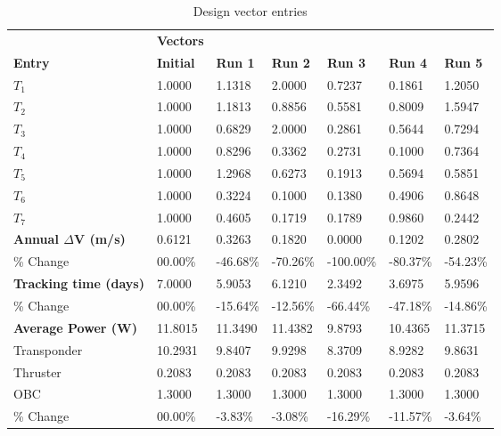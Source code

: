 \begin{table}[H]
\centering
\begin{tabular}{lllllll}
\textbf{} & \cellcolor[HTML]{EFEFEF}\textbf{Vectors} & \textbf{} & \textbf{} & \textbf{} & \textbf{} & \textbf{} \\
\rowcolor[HTML]{EFEFEF} \cellcolor[HTML]{EFEFEF}\textbf{Entry} & \cellcolor[HTML]{EFEFEF}\textbf{Initial} & \cellcolor[HTML]{EFEFEF}\textbf{Run 1} & \cellcolor[HTML]{EFEFEF}\textbf{Run 2} & \cellcolor[HTML]{EFEFEF}\textbf{Run 3} & \cellcolor[HTML]{EFEFEF}\textbf{Run 4} & \cellcolor[HTML]{EFEFEF}\textbf{Run 5} \\
$T_{1}$ & 1.0000 & 1.1318 & 2.0000 & 0.7237 & 0.1861 & 1.2050 \\
$T_{2}$ & 1.0000 & 1.1813 & 0.8856 & 0.5581 & 0.8009 & 1.5947 \\
$T_{3}$ & 1.0000 & 0.6829 & 2.0000 & 0.2861 & 0.5644 & 0.7294 \\
$T_{4}$ & 1.0000 & 0.8296 & 0.3362 & 0.2731 & 0.1000 & 0.7364 \\
$T_{5}$ & 1.0000 & 1.2968 & 0.6273 & 0.1913 & 0.5694 & 0.5851 \\
$T_{6}$ & 1.0000 & 0.3224 & 0.1000 & 0.1380 & 0.4906 & 0.8648 \\
$T_{7}$ & 1.0000 & 0.4605 & 0.1719 & 0.1789 & 0.9860 & 0.2442 \\
\rowcolor[HTML]{EFEFEF} 
\cellcolor[HTML]{EFEFEF}\textbf{Annual $\Delta \boldsymbol{V}$ (m/s)} & \cellcolor[HTML]{EFEFEF}0.6121 & 0.3263 & 0.1820 & 0.0000 & 0.1202 & 0.2802 \\
\% Change & 00.00\% &-46.68\% & -70.26\% & -100.00\% & -80.37\% & -54.23\% \\
\rowcolor[HTML]{EFEFEF} 
\cellcolor[HTML]{EFEFEF}\textbf{Tracking time (days)} & \cellcolor[HTML]{EFEFEF}7.0000 & 5.9053 & 6.1210 & 2.3492 & 3.6975 & 5.9596 \\
\% Change & 00.00\% &-15.64\% & -12.56\% & -66.44\% & -47.18\% & -14.86\% \\
\rowcolor[HTML]{EFEFEF} 
\cellcolor[HTML]{EFEFEF}\textbf{Average Power (W)} & \cellcolor[HTML]{EFEFEF}11.8015 & 11.3490 & 11.4382 & 9.8793 & 10.4365 & 11.3715 \\
Transponder & 10.2931 & 9.8407 & 9.9298 & 8.3709 & 8.9282 & 9.8631 \\
Thruster & 0.2083 & 0.2083 & 0.2083 & 0.2083 & 0.2083 & 0.2083 \\
OBC & 1.3000 & 1.3000 & 1.3000 & 1.3000 & 1.3000 & 1.3000 \\
\% Change & 00.00\% &-3.83\% & -3.08\% & -16.29\% & -11.57\% & -3.64\% \\
\end{tabular}
\caption{Design vector entries}
\label{tab:DesignVectorEntries_default28dur1len3intPropulsionSHSRP}
\end{table}